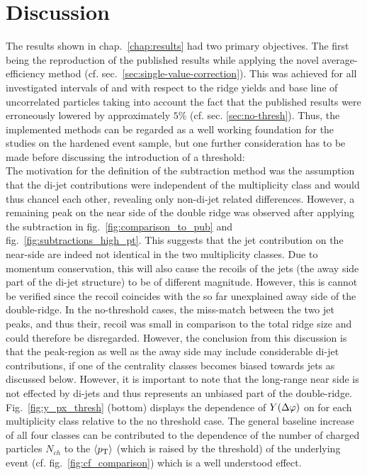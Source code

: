 
\chapter{Discussion}
\label{chap:discussion}
The results shown in chap.~\ref{chap:results} had two primary objectives. The first being the reproduction of the published results while applying the novel average-efficiency method (cf. sec.~\ref{sec:single-value-correction}). This was achieved for all investigated intervals of \ptassoc and \pttrig with respect to the ridge yields and base line of uncorrelated particles taking into account the fact that the published results were erroneously lowered by approximately $5\%$ (cf. sec. \ref{sec:no-thresh}). Thus, the implemented methods can be regarded as a well working foundation for the studies on the hardened event sample, but one further consideration has to be made before discussing the introduction of a threshold:\\

The motivation for the definition of the subtraction method was the assumption that the di-jet contributions were independent of the multiplicity class and would thus chancel each other, revealing only non-di-jet related differences. However, a remaining peak on the near side of the double ridge was observed after applying the subtraction in fig.~\ref{fig:comparison_to_pub} and fig.~\ref{fig:subtractions_high_pt}. This suggests that the jet contribution on the near-side are indeed not identical in the two multiplicity classes. Due to momentum conservation, this will also cause the recoils of the jets (the away side part of the di-jet structure) to be of different magnitude. However, this is cannot be verified since the recoil coincides with the so far unexplained away side of the double-ridge. In the no-threshold cases, the miss-match between the two jet peaks, and thus their, recoil was small in comparison to the total ridge size and could therefore be disregarded. However, the conclusion from this discussion is that the peak-region as well as the away side may include considerable di-jet contributions, if one of the centrality classes becomes biased towards jets as discussed below. However, it is important to note that the long-range near side is not effected by di-jets and thus represents an unbiased part of the double-ridge.\\

Fig.~\ref{fig:y_px_thresh} (bottom) displays the dependence of $Y(\Delta\varphi)$ on \ptthresh for each multiplicity class relative to the no threshold case. The general baseline increase of all four classes can be contributed to the dependence of the number of charged particles $N_{ch}$ to the  $\left< p_{\text{T}} \right>$ (which is raised by the threshold) of the underlying event (cf. fig.~\ref{fig:cf_comparison}) which is a well understood effect.\\

